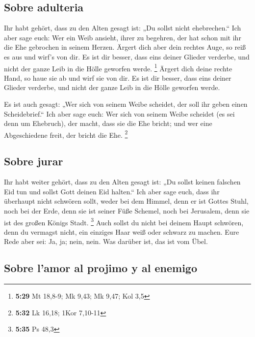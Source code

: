 \hypertarget{sobre-adulteria}{%
\subsection{Sobre adulteria}\label{sobre-adulteria}}

 Ihr habt gehört, dass zu den Alten gesagt ist: „Du
sollst nicht ehebrechen.``  Ich aber sage euch: Wer ein
Weib ansieht, ihrer zu begehren, der hat schon mit ihr die Ehe gebrochen
in seinem Herzen.  Ärgert dich aber dein rechtes Auge, so
reiß es aus und wirf's von dir. Es ist dir besser, dass eins deiner
Glieder verderbe, und nicht der ganze Leib in die Hölle geworfen werde.
\footnote{\textbf{5:29} Mt 18,8-9; Mk 9,43; Mk 9,47; Kol 3,5}
 Ärgert dich deine rechte Hand, so haue sie ab und wirf
sie von dir. Es ist dir besser, dass eins deiner Glieder verderbe, und
nicht der ganze Leib in die Hölle geworfen werde.

 Es ist auch gesagt: „Wer sich von seinem Weibe scheidet,
der soll ihr geben einen Scheidebrief.``  Ich aber sage
euch: Wer sich von seinem Weibe scheidet (es sei denn um Ehebruch), der
macht, dass sie die Ehe bricht; und wer eine Abgeschiedene freit, der
bricht die Ehe. \footnote{\textbf{5:32} Lk 16,18; 1Kor 7,10-11}

\hypertarget{sobre-jurar}{%
\subsection{Sobre jurar}\label{sobre-jurar}}

 Ihr habt weiter gehört, dass zu den Alten gesagt ist:
„Du sollst keinen falschen Eid tun und sollst Gott deinen Eid halten.``
 Ich aber sage euch, dass ihr überhaupt nicht schwören
sollt, weder bei dem Himmel, denn er ist Gottes Stuhl, 
noch bei der Erde, denn sie ist seiner Füße Schemel, noch bei Jerusalem,
denn sie ist des großen Königs Stadt. \footnote{\textbf{5:35} Ps 48,3}
 Auch sollst du nicht bei deinem Haupt schwören, denn du
vermagst nicht, ein einziges Haar weiß oder schwarz zu machen.
 Eure Rede aber sei: Ja, ja; nein, nein. Was darüber ist,
das ist vom Übel.

\hypertarget{sobre-lamor-al-projimo-y-al-enemigo}{%
\subsection{Sobre l'amor al projimo y al
enemigo}\label{sobre-lamor-al-projimo-y-al-enemigo}}

